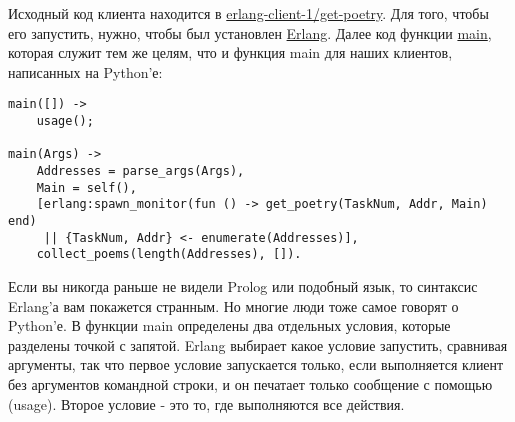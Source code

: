Исходный код клиента находится в  
\href{http://github.com/jdavisp3/twisted-intro/blob/master/erlang-client-1/get-poetry#L1}{erlang-client-1/get-poetry}. 
Для того, чтобы его запустить, нужно, чтобы был 
установлен \href{http://erlang.org/}{Erlang}. Далее 
код функции 
\href{http://github.com/jdavisp3/twisted-intro/blob/master/erlang-client-1/get-poetry#L96}{main}, 
которая служит тем же целям, что и функция main для 
наших клиентов, написанных на Python'е:

 \begin{verbatim}
main([]) ->
    usage();

main(Args) ->
    Addresses = parse_args(Args),
    Main = self(),
    [erlang:spawn_monitor(fun () -> get_poetry(TaskNum, Addr, Main) end)
     || {TaskNum, Addr} <- enumerate(Addresses)],
    collect_poems(length(Addresses), []).

\end{verbatim} 

Если вы никогда раньше не видели Prolog или подобный 
язык, то синтаксис Erlang'а вам покажется странным. 
Но многие люди тоже самое говорят о Python'е. В функции  
main определены два отдельных условия, которые разделены  
точкой с запятой. Erlang выбирает какое условие запустить, 
сравнивая аргументы, так что первое условие запускается 
только, если выполняется клиент без  
аргументов командной строки, и он печатает только 
сообщение с помощью (usage). Второе условие - это то, где 
выполняются все действия. 


